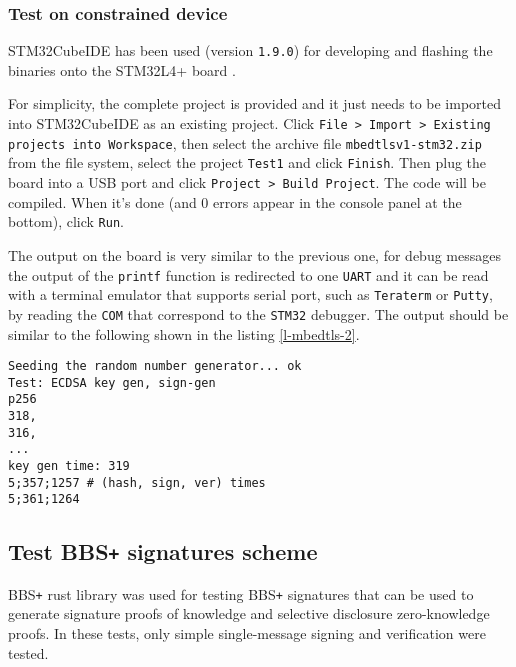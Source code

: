\subsubsection{Test on constrained device}
STM32CubeIDE \cite{cube-ide} has been used (version \texttt{1.9.0}) for developing and flashing the binaries onto the STM32L4+ board \cite{stm32-board-product}.

For simplicity, the complete project is provided and it just needs to be imported into STM32CubeIDE as an existing project. Click \texttt{File > Import > Existing projects into Workspace}, then select the archive file \texttt{mbedtlsv1-stm32.zip} from the file system, select the project \texttt{Test1} and click \texttt{Finish}. Then plug the board into a USB port and click \texttt{Project > Build Project}. The code will be compiled. When it's done (and 0 errors appear in the console panel at the bottom), click \texttt{Run}. 

The output on the board is very similar to the previous one, for debug messages the output of the \texttt{printf} function is redirected to one \texttt{UART} and it can be read with a terminal emulator that supports serial port, such as \texttt{Teraterm} or \texttt{Putty}, by reading the \texttt{COM} that correspond to the \texttt{STM32} debugger. 
The output should be similar to the following shown in the listing \ref{l-mbedtls-2}. \\

\begin{lstlisting}[caption={Example of MbedTLS tests output on constrained device},captionpos=b,label={l-mbedtls-2},style=DOS,frame=single]
Seeding the random number generator... ok
Test: ECDSA key gen, sign-gen
p256
318,
316,
...
key gen time: 319
5;357;1257 # (hash, sign, ver) times
5;361;1264
\end{lstlisting}




\subsection*{Test BBS\texttt{+} signatures scheme}
BBS\texttt{+} rust library was used for testing BBS\texttt{+} signatures that can be used to generate signature proofs of knowledge and selective disclosure zero-knowledge proofs. In these tests, only simple single-message signing and verification were tested.

